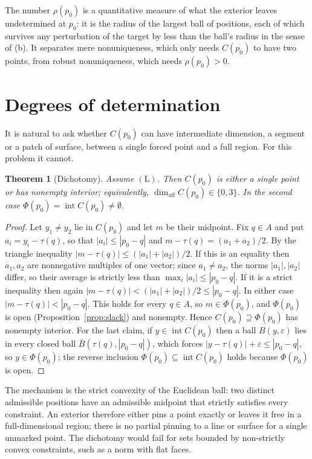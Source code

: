 \documentclass[11pt]{article}
\newtheorem{theorem}{Theorem}
\theoremstyle{definition}
\theoremstyle{remark}
\begin{document}
The number $\rho(p_0)$ is a quantitative measure of what the exterior leaves undetermined at $p_0$: it is the radius of the largest ball of positions, each of which survives any perturbation of the target by less than the ball's radius in the sense of (b). It separates mere nonuniqueness, which only needs $C(p_0)$ to have two points, from robust nonuniqueness, which needs $\rho(p_0)>0$.

\section{Degrees of determination}

It is natural to ask whether $C(p_0)$ can have intermediate dimension, a segment or a patch of surface, between a single forced point and a full region. For this problem it cannot.

\begin{theorem}[Dichotomy]\label{thm:dichotomy}
Assume $(\mathrm L)$. Then $C(p_0)$ is either a single point or has nonempty interior; equivalently, $\dim_{\mathrm{aff}}C(p_0)\in\{0,3\}$. In the second case $\Phi(p_0)=\operatorname{int}C(p_0)\neq\emptyset$.
\end{theorem}

\begin{proof}
Let $y_1\ne y_2$ lie in $C(p_0)$ and let $m$ be their midpoint. Fix $q\in A$ and put $a_i=y_i-\tau(q)$, so that $|a_i|\le|p_0-q|$ and $m-\tau(q)=(a_1+a_2)/2$. By the triangle inequality $|m-\tau(q)|\le(|a_1|+|a_2|)/2$. If this is an equality then $a_1,a_2$ are nonnegative multiples of one vector; since $a_1\ne a_2$, the norms $|a_1|,|a_2|$ differ, so their average is strictly less than $\max_i|a_i|\le|p_0-q|$. If it is a strict inequality then again $|m-\tau(q)|<(|a_1|+|a_2|)/2\le|p_0-q|$. In either case $|m-\tau(q)|<|p_0-q|$. This holds for every $q\in A$, so $m\in\Phi(p_0)$, and $\Phi(p_0)$ is open (Proposition~\ref{prop:slack}) and nonempty. Hence $C(p_0)\supseteq\Phi(p_0)$ has nonempty interior. For the last claim, if $y\in\operatorname{int}C(p_0)$ then a ball $B(y,\varepsilon)$ lies in every closed ball $\overline B(\tau(q),|p_0-q|)$, which forces $|y-\tau(q)|+\varepsilon\le|p_0-q|$, so $y\in\Phi(p_0)$; the reverse inclusion $\Phi(p_0)\subseteq\operatorname{int}C(p_0)$ holds because $\Phi(p_0)$ is open.
\end{proof}

The mechanism is the strict convexity of the Euclidean ball: two distinct admissible positions have an admissible midpoint that strictly satisfies every constraint. An exterior therefore either pins a point exactly or leaves it free in a full-dimensional region; there is no partial pinning to a line or surface for a single unmarked point. The dichotomy would fail for sets bounded by non-strictly convex constraints, such as a norm with flat faces.
\end{document}
